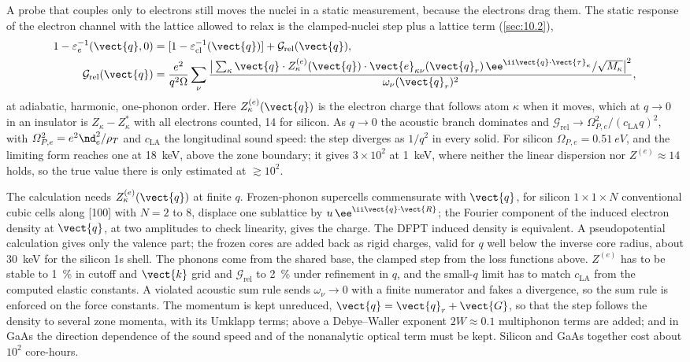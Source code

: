 A probe that couples only to electrons still moves the nuclei in a static measurement, because the electrons drag them. The static response of the electron channel with the lattice allowed to relax is the clamped-nuclei step plus a lattice term (\cref{sec:10.2}),
\begin{align}
  1 - \varepsilon_e^{-1}(\vect{q},0) &= [1 - \varepsilon^{-1}_{\mathrm{cl}}(\vect{q})] + \mathcal{G}_{\mathrm{rel}}(\vect{q}) , \nonumber\\
  \mathcal{G}_{\mathrm{rel}}(\vect{q}) &= \frac{e^2}{q^2\Omega}\sum_\nu\frac{\big|\sum_\kappa\vect{q}\cdot Z^{(e)}_\kappa(\vect{q})\cdot\vect{e}_{\kappa\nu}(\vect{q}_r)\,\ee^{\ii\vect{q}\cdot\vect{\tau}_\kappa}/\sqrt{M_\kappa}\big|^2}{\omega_\nu(\vect{q}_r)^2} ,
  \label{eq:E.16-step}
\end{align}
at adiabatic, harmonic, one-phonon order. Here $Z^{(e)}_\kappa(\vect{q})$ is the electron charge that follows atom $\kappa$ when it moves, which at $q\to0$ in an insulator is $Z_\kappa - Z^*_\kappa$ with all electrons counted, 14 for silicon. As $q\to0$ the acoustic branch dominates and $\mathcal{G}_{\mathrm{rel}} \to \varOmega_{P,e}^2/(c_{\mathrm{LA}}q)^2$, with $\varOmega_{P,e}^2 = e^2\nd_e^2/\rho_T$ and $c_{\mathrm{LA}}$ the longitudinal sound speed: the step diverges as $1/q^2$ in every solid. For silicon $\varOmega_{P,e} = \SI{0.51}{eV}$, and the limiting form reaches one at \SI{18}{keV}, above the zone boundary; it gives $3\times10^2$ at \SI{1}{keV}, where neither the linear dispersion nor $Z^{(e)} \approx 14$ holds, so the true value there is only estimated at $\gtrsim10^2$.

The calculation needs $Z^{(e)}_\kappa(\vect{q})$ at finite $q$. Frozen-phonon supercells commensurate with $\vect{q}$, for silicon $1\times1\times N$ conventional cubic cells along [100] with $N = 2$ to 8, displace one sublattice by $u\,\ee^{\ii\vect{q}\cdot\vect{R}}$; the Fourier component of the induced electron density at $\vect{q}$, at two amplitudes to check linearity, gives the charge. The DFPT induced density is equivalent. A pseudopotential calculation gives only the valence part; the frozen cores are added back as rigid charges, valid for $q$ well below the inverse core radius, about \SI{30}{keV} for the silicon 1s shell. The phonons come from the shared base, the clamped step from the loss functions above. $Z^{(e)}$ has to be stable to \SI{1}{\percent} in cutoff and $\vect{k}$ grid and $\mathcal{G}_{\mathrm{rel}}$ to \SI{2}{\percent} under refinement in $q$, and the small-$q$ limit has to match $c_{\mathrm{LA}}$ from the computed elastic constants. A violated acoustic sum rule sends $\omega_\nu \to 0$ with a finite numerator and fakes a divergence, so the sum rule is enforced on the force constants. The momentum is kept unreduced, $\vect{q} = \vect{q}_r + \vect{G}$, so that the step follows the density to several zone momenta, with its Umklapp terms; above a Debye--Waller exponent $2W \approx 0.1$ multiphonon terms are added; and in GaAs the direction dependence of the sound speed and of the nonanalytic optical term must be kept. Silicon and GaAs together cost about $10^2$ core-hours.

